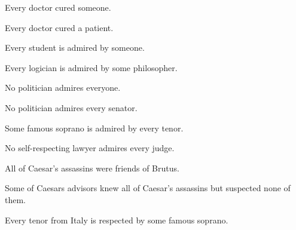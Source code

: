 \begin{earg}

\item Every doctor cured someone.

\item Every doctor cured a patient.

\item Every student is admired by someone.

\item Every logician is admired by some philosopher.

\item No politician admires everyone.

\item No  politician admires every senator.

\item Some famous soprano is admired by every tenor.  

\item No self-respecting lawyer admires every judge.

\item All of Caesar's assassins were friends of Brutus.

\item Some of Caesars advisors knew all of Caesar's assassins but suspected none of them.

\item Every tenor from Italy is respected by some famous soprano.


\end{earg}



